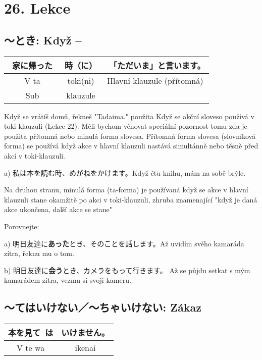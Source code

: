\section{26. Lekce}
\label{sec:lekce_26}
\subsection{〜とき: Když --}

\begin{center}
\begin{tabular}{||c|c||c||}
\hline
家に帰った　&時（に）&　「ただいま」と言います。\\
\hline
V ta&toki(ni)&Hlavní klauzule (přítomná)\\
\hline
Sub&klauzule&\\
\hline
\end{tabular}
\end{center}
Když se vrátíš domů, řekneš "Tadaima."
použita
Když se akční sloveso používá v toki-klauzuli (Lekce 22). Měli bychom věnovat speciální pozornost tomu zda je použita přítomná nebo minulá forma slovesa. Přítomná forma slovesa (slovníková forma) se používá když akce v hlavní klauzuli nastává simultánně nebo těsně před akcí v toki-klauzuli.

a) 私は本を読む時、めがねをかけます。Když čtu knihu, mám na sobě brýle.

Na druhou stranu, minulá forma (ta-forma) je používaná když se akce v hlavní klauzuli stane okamžitě po akci v toki-klauzuli, zhruba znamenající "když je daná akce ukončena, další akce se stane"

Porovnejte: 

a) 明日友達に\textbf{あった}とき、そのことを話します。Až uvidím svého kamaráda zítra, řeknu mu o tom.

b) 明日友達に\textbf{会う}とき、カメラをもって行きます。 Až se půjdu setkat s mým kamarádem zítra, vezmu si svoji kameru.


\subsection{〜てはいけない／〜ちゃいけない: Zákaz}

\begin{center}
\begin{tabular}{||c|c||}
\hline
本を見て は&いけません。\\
\hline
V te wa&ikenai\\
\hline
\end{tabular}
\end{center}

